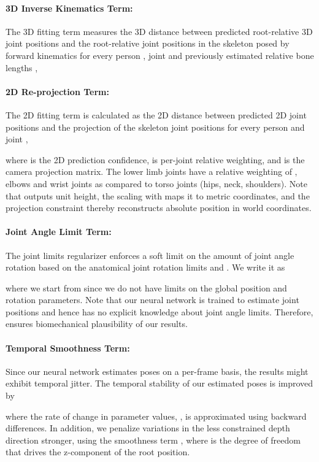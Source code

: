 \documentclass[acmtog,authorversion]{acmart}
\begin{document}
\paragraph{3D Inverse Kinematics Term:}
The 3D fitting term measures the 3D distance between predicted root-relative 3D joint positions  and the root-relative joint positions in the skeleton  posed by forward kinematics for every person , joint  and previously estimated relative bone lengths ,


\paragraph{2D Re-projection Term:}
The 2D fitting term is calculated as the 2D distance between predicted 2D joint positions  and the projection of the skeleton joint positions  for every person  and joint ,

where  is the 2D prediction confidence,  is per-joint relative weighting, and  is the camera projection matrix. 
The lower limb joints have a relative weighting of , elbows  and wrist joints  as compared to torso joints (hips, neck, shoulders).
Note that  outputs unit height, the scaling with  maps it to metric coordinates, and the projection constraint thereby reconstructs absolute position in world coordinates.

\paragraph{Joint Angle Limit Term:}
The joint limits regularizer enforces a soft limit on the amount of joint angle rotation based on the anatomical joint rotation limits  and . We write it as 

where we start from  since we do not have limits on the global position and rotation parameters.
Note that our neural network is trained to estimate joint positions and hence has no explicit knowledge about joint angle limits.
Therefore,  ensures biomechanical plausibility of our results.

\paragraph{Temporal Smoothness Term:}
Since our neural network estimates poses on a per-frame basis, the results might exhibit temporal jitter.
The temporal stability of our estimated poses is improved by

where
the rate of change in parameter values, , is approximated using backward differences. In addition, we 
penalize variations in the less constrained depth direction stronger, using the smoothness term , where  is the degree of freedom that drives the z-component of the root position.
\end{document}
